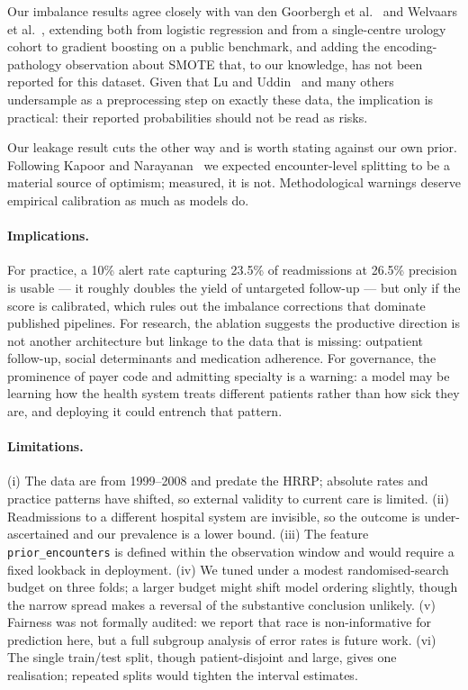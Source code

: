 \documentclass[runningheads]{llncs}
\begin{document}
Our imbalance results agree closely with van den Goorbergh et al.~\cite{goorbergh2022}
and Welvaars et al.~\cite{welvaars2023}, extending both from logistic regression and
from a single-centre urology cohort to gradient boosting on a public benchmark, and
adding the encoding-pathology observation about SMOTE that, to our knowledge, has not
been reported for this dataset. Given that Lu and Uddin~\cite{lu2022} and many others
undersample as a preprocessing step on exactly these data, the implication is
practical: their reported probabilities should not be read as risks.

Our leakage result cuts the other way and is worth stating against our own prior.
Following Kapoor and Narayanan~\cite{kapoor2023} we expected encounter-level splitting
to be a material source of optimism; measured, it is not. Methodological warnings
deserve empirical calibration as much as models do.

\paragraph{Implications.} For practice, a 10\% alert rate capturing 23.5\% of
readmissions at 26.5\% precision is usable --- it roughly doubles the yield of
untargeted follow-up --- but only if the score is calibrated, which rules out the
imbalance corrections that dominate published pipelines. For research, the ablation
suggests the productive direction is not another architecture but linkage to the data
that is missing: outpatient follow-up, social determinants and medication adherence.
For governance, the prominence of payer code and admitting specialty is a warning:
a model may be learning how the health system treats different patients rather than
how sick they are, and deploying it could entrench that pattern.

\paragraph{Limitations.} (i) The data are from 1999--2008 and predate the HRRP;
absolute rates and practice patterns have shifted, so external validity to current
care is limited. (ii) Readmissions to a different hospital system are invisible, so
the outcome is under-ascertained and our prevalence is a lower bound. (iii) The
feature \texttt{prior\_encounters} is defined within the observation window and would
require a fixed lookback in deployment. (iv) We tuned under a modest randomised-search
budget on three folds; a larger budget might shift model ordering slightly, though the
narrow spread makes a reversal of the substantive conclusion unlikely. (v) Fairness
was not formally audited: we report that race is non-informative for prediction here,
but a full subgroup analysis of error rates is future work. (vi) The single
train/test split, though patient-disjoint and large, gives one realisation; repeated
splits would tighten the interval estimates.
\end{document}
